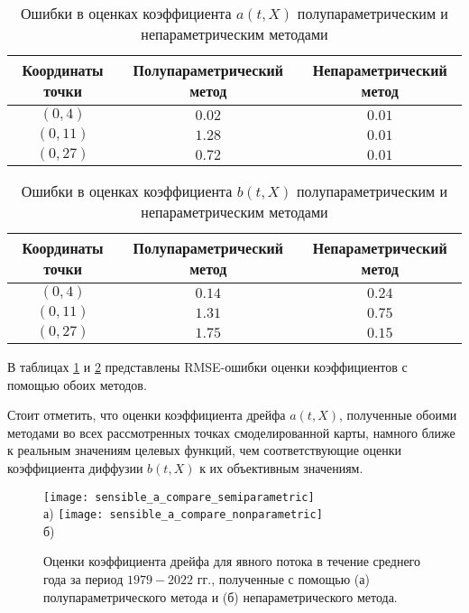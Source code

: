 \begin{table}[h!]
	\centering
	\caption{Ошибки в оценках коэффициента $a(t,X)$ полупараметрическим и непараметрическим методами}
	\begin{tabular}{|c|c|c|}
		\hline
		Координаты точки & Полупараметрический метод & Непараметрический метод \\
		\hline
		$(0, 4)$ & $0.02$ & $0.01$ \\
		$(0, 11)$ & $1.28$ & $0.01$ \\
		$(0, 27)$ & $0.72$ & $0.01$ \\
		\hline
	\end{tabular}
	\label{tab:errors_estimation_a}
\end{table}

\begin{table}[h!]
	\centering
	\caption{Ошибки в оценках коэффициента $b(t,X)$ полупараметрическим и непараметрическим методами}
	\begin{tabular}{|c|c|c|}
		\hline
		Координаты точки & Полупараметрический метод & Непараметрический метод \\
		\hline
		$(0, 4)$ & $0.14$ & $0.24$ \\
		$(0, 11)$ & $1.31$ & $0.75$ \\
		$(0, 27)$ & $1.75$ & $0.15$ \\
		\hline
	\end{tabular}
	\label{tab:errors_estimation_b}
\end{table}

В таблицах \ref{tab:errors_estimation_a} и \ref{tab:errors_estimation_b} представлены RMSE-ошибки оценки коэффициентов с помощью обоих методов.

Стоит отметить, что оценки коэффициента дрейфа $a(t,X)$, полученные обоими методами во всех рассмотренных точках смоделированной карты, намного ближе к реальным значениям целевых функций, чем соответствующие оценки коэффициента диффузии $b(t,X)$ к их объективным значениям.


\begin{figure}[!h]
	\centering
	\texttt{[image: sensible\_a\_compare\_semiparametric]}\\
	а)
	\texttt{[image: sensible\_a\_compare\_nonparametric]}\\
	б)
	\caption{Оценки коэффициента дрейфа для явного потока в течение среднего года за период $1979-2022$ гг., полученные с помощью (а) полупараметрического метода и (б) непараметрического метода.} 
	\label{fig:sensible_compare_a}
\end{figure}


